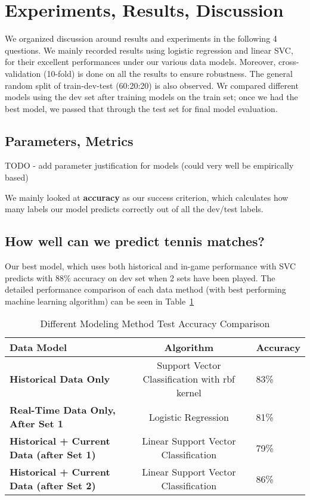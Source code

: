 \documentclass[paper=a4, fontsize=10pt]{scrartcl} %
\numberwithin{equation}{section} %
\numberwithin{figure}{section} %
\numberwithin{table}{section} %
\begin{document}

\section{Experiments, Results, Discussion}
We organized discussion around results and experiments in the following 4 questions. We mainly recorded results using logistic regression and linear SVC, for their excellent performances under our various data models. Moreover, cross-validation (10-fold) is done on all the results to ensure robustness. The general random split of train-dev-test (60:20:20) is also observed. Wr compared different models using the dev set after training models on the train set; once we had the best model, we passed that through the test set for final model evaluation. 
\subsection{Parameters, Metrics}
TODO - add parameter justification for models (could very well be empirically based)

We mainly looked at \textbf{accuracy} as our success criterion, which calculates how many labels our model predicts correctly out of all the dev/test labels.  
\subsection{How well can we predict tennis matches?}
Our best model, which uses both historical and in-game performance with SVC predicts with $88\%$ accuracy on dev set when 2 sets have been played. The detailed performance comparison of each data method (with best performing machine learning algorithm) can be seen in Table~\ref{tab:m1}
\begin{table}[h]
\caption{Different Modeling Method Test Accuracy Comparison}
\label{tab:m1}
\begin{tabular}{ p{3cm} | c | p{2cm}}
    \hline
    \textbf{Data Model} & \textbf{Algorithm} & \textbf{Accuracy}  \\ \hline
   \textbf{Historical Data Only} &  Support Vector Classification with rbf kernel & 83\%  \\ \hline
   \textbf{Real-Time Data Only, After Set 1} & Logistic Regression & 81\%  \\ \hline
   \textbf{Historical + Current Data (after Set 1)} &  Linear Support Vector Classification & 79\%  \\ \hline
   \textbf{Historical + Current Data (after Set 2)} &  Linear Support Vector Classification & 86\% \\ \hline
\end{tabular}
\end{table}
\end{document}
